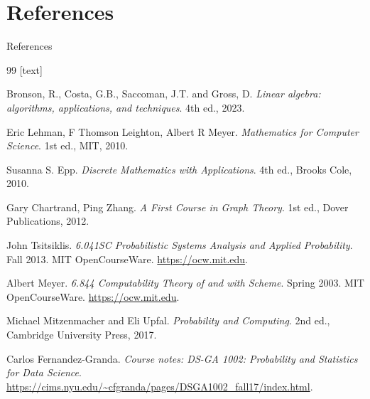 \documentclass[10pt, aspectratio=169]{beamer}
\begin{document}
\section{References}
\begin{frame}[allowframebreaks]{References}
    \begin{thebibliography}{99}
        [text]
        
        Bronson, R., Costa, G.B., Saccoman, J.T. and Gross, D.
        \newblock \emph{Linear algebra: algorithms, applications, and techniques}. 4th ed., 2023.
        
        Eric Lehman, F Thomson Leighton, Albert R Meyer.
        \newblock \emph{Mathematics for Computer Science}. 1st ed., MIT, 2010.
        
        Susanna S. Epp.
        \newblock \emph{Discrete Mathematics with Applications}. 4th ed., Brooks Cole, 2010.
        
        Gary Chartrand, Ping Zhang.
        \newblock \emph{A First Course in Graph Theory}. 1st ed., Dover Publications, 2012.
        
        John Tsitsiklis.
        \newblock \emph{6.041SC Probabilistic Systems Analysis and Applied Probability}. Fall 2013. MIT OpenCourseWare. \url{https://ocw.mit.edu}.
        
        Albert Meyer.
        \newblock \emph{6.844 Computability Theory of and with Scheme}. Spring 2003. MIT OpenCourseWare. \url{https://ocw.mit.edu}.
        
        Michael Mitzenmacher and Eli Upfal.
        \newblock \emph{Probability and Computing}. 2nd ed., Cambridge University Press, 2017.
        
        Carlos Fernandez-Granda.
        \newblock \emph{Course notes: DS-GA 1002: Probability and Statistics for Data Science}. \url{https://cims.nyu.edu/~cfgranda/pages/DSGA1002_fall17/index.html}.
        
    \end{thebibliography}
\end{frame}
\end{document}
